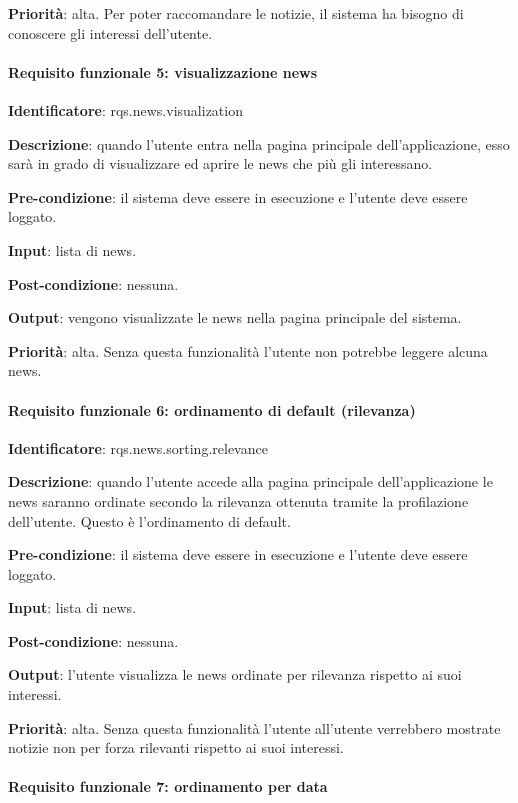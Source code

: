 \documentclass[12pt]{article}
\begin{document}
\textbf{Priorità}: alta. Per poter raccomandare le notizie, il sistema ha bisogno di conoscere gli interessi dell’utente.

\paragraph{Requisito funzionale 5: visualizzazione news}

\textbf{Identificatore}: rqs.news.visualization

\textbf{Descrizione}: quando l’utente entra nella pagina principale dell’applicazione, esso sarà in grado di visualizzare ed aprire le news che più gli interessano.

\textbf{Pre-condizione}: il sistema deve essere in esecuzione e l’utente deve essere loggato.

\textbf{Input}:  lista di news.

\textbf{Post-condizione}: nessuna.

\textbf{Output}: vengono visualizzate le news nella pagina principale del sistema.

\textbf{Priorità}: alta. Senza questa funzionalità l’utente non potrebbe leggere alcuna news.

\paragraph{Requisito funzionale 6: ordinamento di default (rilevanza)}

\textbf{Identificatore}: rqs.news.sorting.relevance

\textbf{Descrizione}: quando l'utente accede alla pagina principale dell'applicazione le news saranno ordinate secondo la rilevanza ottenuta tramite la profilazione dell'utente. Questo è l'ordinamento di default.

\textbf{Pre-condizione}: il sistema deve essere in esecuzione e l'utente deve essere loggato.

\textbf{Input}: lista di news.

\textbf{Post-condizione}: nessuna.

\textbf{Output}: l'utente visualizza le news ordinate per rilevanza rispetto ai suoi interessi.

\textbf{Priorità}: alta. Senza questa funzionalità l'utente all'utente verrebbero mostrate notizie non per forza rilevanti rispetto ai suoi interessi.

\paragraph{Requisito funzionale 7: ordinamento per data}
\end{document}
